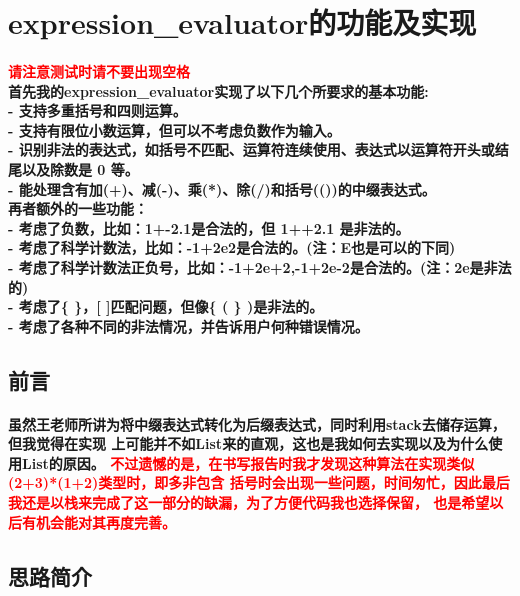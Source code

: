 \documentclass[UTF8]{ctexart}
\begin{document}
\pagestyle{fancy}
\fancyhead{}
\setlength{\headheight}{12.64723pt}

\section{expression\_evaluator的功能及实现}

\paragraph{
    \textcolor{red}{请注意测试时请不要出现空格}\\
首先我的expression\_evaluator实现了以下几个所要求的基本功能: \\
- 支持多重括号和四则运算。\\
- 支持有限位小数运算，但可以不考虑负数作为输入。\\
- 识别非法的表达式，如括号不匹配、运算符连续使用、表达式以运算符开头或结尾以及除数是 0 等。\\
- 能处理含有加(+)、减(-)、乘(*)、除(/)和括号(())的中缀表达式。\\
再者额外的一些功能：\\
- 考虑了负数，比如：1+-2.1是合法的，但 1++2.1 是非法的。\\
- 考虑了科学计数法，比如：-1+2e2是合法的。(注：E也是可以的下同)\\
- 考虑了科学计数法正负号，比如：-1+2e+2,-1+2e-2是合法的。(注：2e是非法的)\\
- 考虑了\{ \}，[ ]匹配问题，但像\{ ( \} )是非法的。\\
- 考虑了各种不同的非法情况，并告诉用户何种错误情况。\\
}
\subsection{前言}
\paragraph{\hspace{2em}
虽然王老师所讲为将中缀表达式转化为后缀表达式，同时利用stack去储存运算，但我觉得在实现
上可能并不如List来的直观，这也是我如何去实现以及为什么使用List的原因。
\textcolor{red}{不过遗憾的是，在书写报告时我才发现这种算法在实现类似(2+3)*(1+2)类型时，即多非包含
括号时会出现一些问题，时间匆忙，因此最后我还是以栈来完成了这一部分的缺漏，为了方便代码我也选择保留，
也是希望以后有机会能对其再度完善。}
}
\subsection{思路简介}
\end{document}
